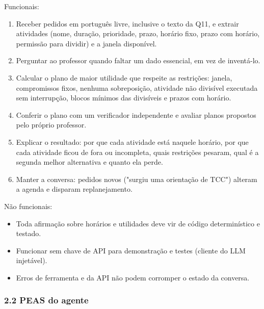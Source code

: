 \documentclass[12pt, a4paper]{article}
\providecommand{\tightlist}{%
  \setlength{\itemsep}{0pt}\setlength{\parskip}{0pt}}
\begin{document}
Funcionais:

\begin{enumerate}
\def\labelenumi{\arabic{enumi}.}
\tightlist
\item
  Receber pedidos em português livre, inclusive o texto da Q11, e extrair atividades (nome, duração, prioridade, prazo, horário fixo, prazo com horário, permissão para dividir) e a janela disponível.
\item
  Perguntar ao professor quando faltar um dado essencial, em vez de inventá-lo.
\item
  Calcular o plano de maior utilidade que respeite as restrições: janela, compromissos fixos, nenhuma sobreposição, atividade não divisível executada sem interrupção, blocos mínimos das divisíveis e prazos com horário.
\item
  Conferir o plano com um verificador independente e avaliar planos propostos pelo próprio professor.
\item
  Explicar o resultado: por que cada atividade está naquele horário, por que cada atividade ficou de fora ou incompleta, quais restrições pesaram, qual é a segunda melhor alternativa e quanto ela perde.
\item
  Manter a conversa: pedidos novos ("surgiu uma orientação de TCC") alteram a agenda e disparam replanejamento.
\end{enumerate}

Não funcionais:

\begin{itemize}
\tightlist
\item
  Toda afirmação sobre horários e utilidades deve vir de código determinístico e testado.
\item
  Funcionar sem chave de API para demonstração e testes (cliente do LLM injetável).
\item
  Erros de ferramenta e da API não podem corromper o estado da conversa.
\end{itemize}

\subsubsection{2.2 PEAS do agente}\label{22-peas-do-agente}
\end{document}
